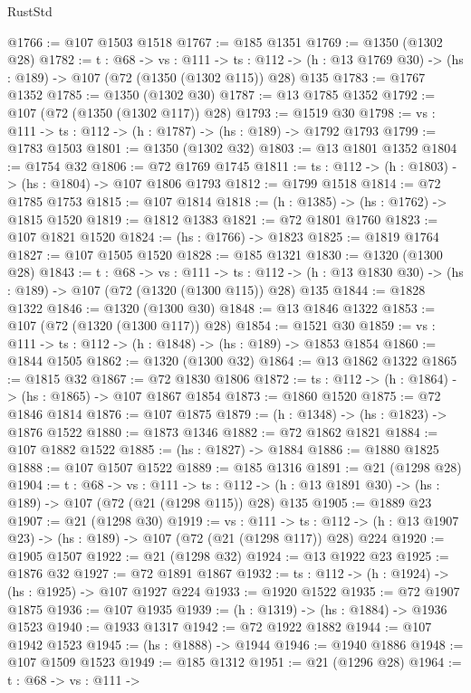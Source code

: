 \begin{lexlean}{RustStd}
\begin{coremodule}
@1766 := @107 @1503 @1518
@1767 := @185 @1351
@1769 := @1350 (@1302 @28)
@1782 := {t : @68} ->
  {vs : @111} ->
  {ts : @112} -> (h : @13 @1769 @30) -> (hs : @189) -> @107 (@72 (@1350 (@1302 @115)) @28) @135
@1783 := @1767 @1352
@1785 := @1350 (@1302 @30)
@1787 := @13 @1785 @1352
@1792 := @107 (@72 (@1350 (@1302 @117)) @28)
@1793 := @1519 @30
@1798 := {vs : @111} -> {ts : @112} -> (h : @1787) -> (hs : @189) -> @1792 @1793
@1799 := @1783 @1503
@1801 := @1350 (@1302 @32)
@1803 := @13 @1801 @1352
@1804 := @1754 @32
@1806 := @72 @1769 @1745
@1811 := {ts : @112} -> (h : @1803) -> (hs : @1804) -> @107 @1806 @1793
@1812 := @1799 @1518
@1814 := @72 @1785 @1753
@1815 := @107 @1814
@1818 := (h : @1385) -> (hs : @1762) -> @1815 @1520
@1819 := @1812 @1383
@1821 := @72 @1801 @1760
@1823 := @107 @1821 @1520
@1824 := (hs : @1766) -> @1823
@1825 := @1819 @1764
@1827 := @107 @1505 @1520
@1828 := @185 @1321
@1830 := @1320 (@1300 @28)
@1843 := {t : @68} ->
  {vs : @111} ->
  {ts : @112} -> (h : @13 @1830 @30) -> (hs : @189) -> @107 (@72 (@1320 (@1300 @115)) @28) @135
@1844 := @1828 @1322
@1846 := @1320 (@1300 @30)
@1848 := @13 @1846 @1322
@1853 := @107 (@72 (@1320 (@1300 @117)) @28)
@1854 := @1521 @30
@1859 := {vs : @111} -> {ts : @112} -> (h : @1848) -> (hs : @189) -> @1853 @1854
@1860 := @1844 @1505
@1862 := @1320 (@1300 @32)
@1864 := @13 @1862 @1322
@1865 := @1815 @32
@1867 := @72 @1830 @1806
@1872 := {ts : @112} -> (h : @1864) -> (hs : @1865) -> @107 @1867 @1854
@1873 := @1860 @1520
@1875 := @72 @1846 @1814
@1876 := @107 @1875
@1879 := (h : @1348) -> (hs : @1823) -> @1876 @1522
@1880 := @1873 @1346
@1882 := @72 @1862 @1821
@1884 := @107 @1882 @1522
@1885 := (hs : @1827) -> @1884
@1886 := @1880 @1825
@1888 := @107 @1507 @1522
@1889 := @185 @1316
@1891 := @21 (@1298 @28)
@1904 := {t : @68} ->
  {vs : @111} ->
  {ts : @112} -> (h : @13 @1891 @30) -> (hs : @189) -> @107 (@72 (@21 (@1298 @115)) @28) @135
@1905 := @1889 @23
@1907 := @21 (@1298 @30)
@1919 := {vs : @111} ->
  {ts : @112} -> (h : @13 @1907 @23) -> (hs : @189) -> @107 (@72 (@21 (@1298 @117)) @28) @224
@1920 := @1905 @1507
@1922 := @21 (@1298 @32)
@1924 := @13 @1922 @23
@1925 := @1876 @32
@1927 := @72 @1891 @1867
@1932 := {ts : @112} -> (h : @1924) -> (hs : @1925) -> @107 @1927 @224
@1933 := @1920 @1522
@1935 := @72 @1907 @1875
@1936 := @107 @1935
@1939 := (h : @1319) -> (hs : @1884) -> @1936 @1523
@1940 := @1933 @1317
@1942 := @72 @1922 @1882
@1944 := @107 @1942 @1523
@1945 := (hs : @1888) -> @1944
@1946 := @1940 @1886
@1948 := @107 @1509 @1523
@1949 := @185 @1312
@1951 := @21 (@1296 @28)
@1964 := {t : @68} ->
  {vs : @111} ->

\end{coremodule}
\end{lexlean}
